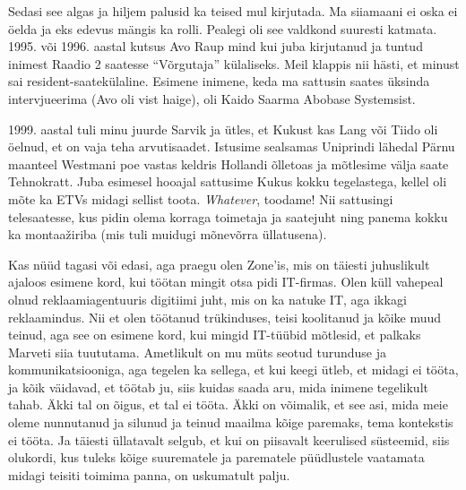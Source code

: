 Sedasi see algas ja hiljem palusid ka teised mul kirjutada. 
Ma siiamaani ei oska ei öelda ja eks edevus mängis ka rolli. 
Pealegi oli see valdkond suuresti katmata. 1995. või 1996. aastal kutsus Avo Raup mind kui juba kirjutanud ja tuntud inimest Raadio 2 saatesse \enquote{Võrgutaja} külaliseks. Meil klappis nii hästi, et minust sai resident-saatekülaline. Esimene inimene, keda 
ma sattusin saates üksinda intervjueerima (Avo oli vist haige), oli Kaido 
Saarma Abobase Systemsist. 

1999. aastal tuli minu juurde 
Sarvik ja ütles, et Kukust kas Lang või Tiido oli öelnud, et on vaja teha arvutisaadet. Istusime sealsamas Uniprindi 
lähedal Pärnu maanteel Westmani poe vastas keldris Hollandi 
õlletoas ja mõtlesime välja saate Tehnokratt. Juba esimesel hooajal sattusime Kukus kokku 
tegelastega, kellel oli mõte ka ETVs midagi sellist toota. \emph{Whatever}, toodame! Nii sattusingi 
telesaatesse, kus pidin olema korraga toimetaja ja saatejuht ning panema kokku ka montaažiriba (mis tuli muidugi mõnevõrra üllatusena).


Kas nüüd tagasi või edasi, aga praegu olen Zone'is, mis on täiesti 
juhuslikult ajaloos esimene kord, kui töötan mingit otsa pidi 
IT-firmas. Olen küll vahepeal olnud reklaamiagentuuris digitiimi juht, 
mis on ka natuke IT, aga ikkagi reklaamindus. Nii et olen töötanud trükinduses, teisi koolitanud ja kõike muud teinud, 
aga see on esimene kord, kui mingid IT-tüübid mõtlesid, et palkaks Marveti siia 
tuututama. Ametlikult on mu müts seotud turunduse ja kommunikatsiooniga, aga 
tegelen ka sellega, et kui keegi ütleb, et midagi ei tööta, ja kõik 
väidavad, et töötab ju, siis kuidas saada aru, mida inimene 
tegelikult tahab. Äkki tal on õigus, et tal ei tööta. Äkki on võimalik, 
et see asi, mida meie oleme nunnutanud ja silunud ja teinud maailma kõige 
paremaks, tema kontekstis ei tööta. Ja täiesti üllatavalt selgub, 
et kui on piisavalt keerulised süsteemid, siis olukordi, kus tuleks 
kõige suurematele ja parematele püüdlustele vaatamata midagi 
teisiti toimima panna, on uskumatult 
palju. 


